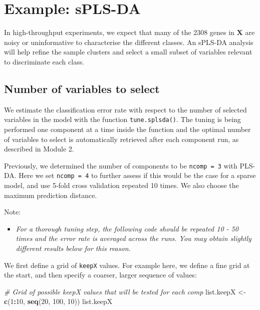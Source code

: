 \documentclass[]{book}
\newenvironment{Shaded}{\begin{snugshade}}{\end{snugshade}}
\newcommand{\CommentTok}[1]{\textcolor[rgb]{0.56,0.35,0.01}{\textit{#1}}}
\newcommand{\DecValTok}[1]{\textcolor[rgb]{0.00,0.00,0.81}{#1}}
\newcommand{\KeywordTok}[1]{\textcolor[rgb]{0.13,0.29,0.53}{\textbf{#1}}}
\newcommand{\NormalTok}[1]{#1}
\newcommand{\OperatorTok}[1]{\textcolor[rgb]{0.81,0.36,0.00}{\textbf{#1}}}
\newcommand{\StringTok}[1]{\textcolor[rgb]{0.31,0.60,0.02}{#1}}
\providecommand{\tightlist}{%
  \setlength{\itemsep}{0pt}\setlength{\parskip}{0pt}}
\begin{document}
\hypertarget{ex:splsda}{%
\section{Example: sPLS-DA}\label{ex:splsda}}

In high-throughput experiments, we expect that many of the 2308 genes in \(\boldsymbol X\) are noisy or uninformative to characterise the different classes. An sPLS-DA analysis will help refine the sample clusters and select a small subset of variables relevant to discriminate each class.

\hypertarget{plsda:result:numvar}{%
\subsection{Number of variables to select}\label{plsda:result:numvar}}

We estimate the classification error rate with respect to the number of selected variables in the model with the function \texttt{tune.splsda()}. The tuning is being performed one component at a time inside the function and the optimal number of variables to select is automatically retrieved after each component run, as described in Module 2.

Previously, we determined the number of components to be \texttt{ncomp\ =\ 3} with PLS-DA. Here we set \texttt{ncomp\ =\ 4} to further assess if this would be the case for a sparse model, and use 5-fold cross validation repeated 10 times. We also choose the maximum prediction distance.

Note:

\begin{itemize}
\tightlist
\item
  \emph{For a thorough tuning step, the following code should be repeated 10 - 50 times and the error rate is averaged across the runs. You may obtain slightly different results below for this reason.}
\end{itemize}

We first define a grid of \texttt{keepX} values. For example here, we define a fine grid at the start, and then specify a coarser, larger sequence of values:

\begin{Shaded}
\begin{Highlighting}[]
\CommentTok{# Grid of possible keepX values that will be tested for each comp}
\NormalTok{list.keepX <-}\StringTok{ }\KeywordTok{c}\NormalTok{(}\DecValTok{1}\OperatorTok{:}\DecValTok{10}\NormalTok{,  }\KeywordTok{seq}\NormalTok{(}\DecValTok{20}\NormalTok{, }\DecValTok{100}\NormalTok{, }\DecValTok{10}\NormalTok{))}
\NormalTok{list.keepX}
\end{Highlighting}
\end{Shaded}
\end{document}
